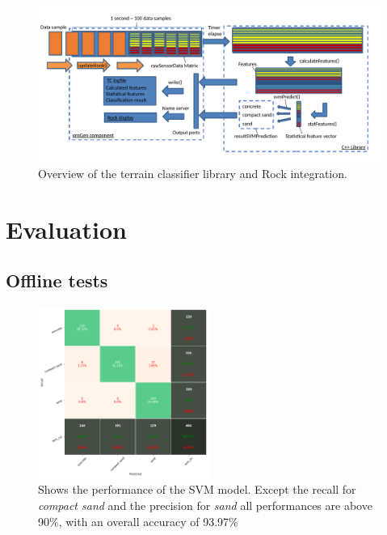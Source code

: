 \documentclass{article}
\begin{document}
\begin{figure}[h]
\centering
\includegraphics[width=\textwidth]{../figures/OverviewTC2.pdf}
\caption{\label{fig:overview}Overview of the terrain classifier library and Rock integration.}
\end{figure}



\section{Evaluation}
\subsection{Offline tests}

\begin{figure}[h]
\centering
\includegraphics[width=0.5\textwidth]{../figures/confusionmatrix_Train.png}
\caption{\label{fig:confusionmatrix} Shows the performance of the SVM model. Except the recall for \emph{compact sand} and the precision for \emph{sand} all performances are above 90\%, with an overall accuracy of 93.97\%}
\end{figure}
\end{document}
